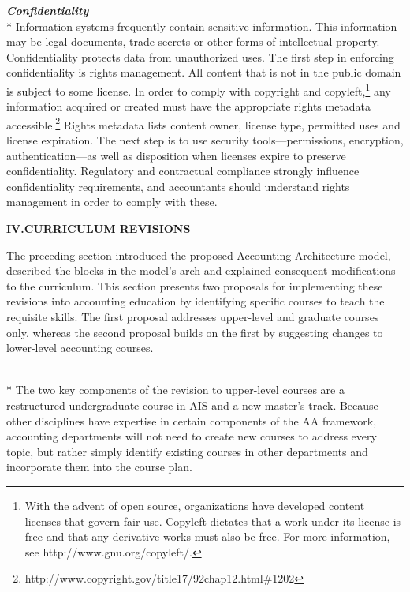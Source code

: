 \documentclass[12pt]{article}
\newcommand{\Section}[2]{\vspace{.2in}\centerline{\normalsize{}\textbf{#1\quad{}\MakeUppercase{#2}}}\nopagebreak{}\smallskip{}\indent{}}
\newcommand{\SubSection}[1]{\vspace{.15in}{\centering{}\normalsize{}\textbf{#1}}\\*\indent{}}
\newcommand{\SubSubSection}[1]{{\centering{}\normalsize{}\textbf{\emph{#1}}}\\*\indent{}}
\begin{document}
\SubSubSection{Confidentiality}
Information systems frequently contain sensitive information. This information may be legal documents, trade secrets or other forms of intellectual property. Confidentiality protects data from unauthorized uses. The first step in enforcing confidentiality is rights management. All content that is not in the public domain is subject to some license. In order to comply with copyright and copyleft,\footnote{With the advent of open source, organizations have developed content licenses that govern fair use. Copyleft dictates that a work under its license is free and that any derivative works must also be free. For more information, see http://www.gnu.org/copyleft/.} any information acquired or created must have the appropriate rights metadata accessible.\footnote{http://www.copyright.gov/title17/92chap12.html\#1202} Rights metadata lists content owner, license type, permitted uses and license expiration. The next step is to use security tools---permissions, encryption, authentication---as well as disposition when licenses expire to preserve confidentiality. Regulatory and contractual compliance strongly influence confidentiality requirements, and accountants should understand rights management in order to comply with these.

\Section{IV.}{Curriculum Revisions}
The preceding section introduced the proposed Accounting Architecture model, described the blocks in the model's arch and explained consequent modifications to the curriculum. This section presents two proposals for implementing these revisions into accounting education by identifying specific courses to teach the requisite skills. The first proposal addresses upper-level and graduate courses only, whereas the second proposal builds on the first by suggesting changes to lower-level accounting courses.

\SubSection{Upper-level Courses}
The two key components of the revision to upper-level courses are a restructured undergraduate course in AIS and a new master's track. Because other disciplines have expertise in certain components of the AA framework, accounting departments will not need to create new courses to address every topic, but rather simply identify existing courses in other departments and incorporate them into the course plan.
\end{document}
